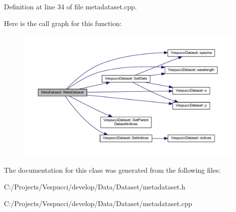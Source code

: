 Definition at line 34 of file metadataset.\+cpp.



Here is the call graph for this function\+:\nopagebreak
\begin{figure}[H]
\begin{center}
\leavevmode
\includegraphics[width=350pt]{class_meta_dataset_a18bdddde9c879805c1f6be74b30728d3_cgraph}
\end{center}
\end{figure}




The documentation for this class was generated from the following files\+:\begin{DoxyCompactItemize}
\item 
C\+:/\+Projects/\+Vespucci/develop/\+Data/\+Dataset/metadataset.\+h\item 
C\+:/\+Projects/\+Vespucci/develop/\+Data/\+Dataset/metadataset.\+cpp\end{DoxyCompactItemize}
